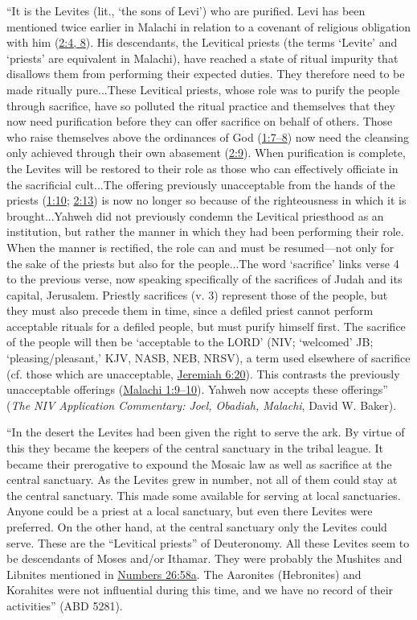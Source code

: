 		``It is the Levites (lit., `the sons of Levi') who are purified. Levi has been mentioned twice earlier in Malachi in relation to a covenant of religious obligation with him (\hyperref[MALACHI-2-4]{2:4, 8}). His descendants, the Levitical priests (the terms `Levite' and `priests' are equivalent in Malachi), have reached a state of ritual impurity that disallows them from performing their expected duties. They therefore need to be made ritually pure...These Levitical priests, whose role was to purify the people through sacrifice, have so polluted the ritual practice and themselves that they now need purification before they can offer sacrifice on behalf of others. Those who raise themselves above the ordinances of God (\hyperref[MALACHI-1-7]{1:7--8}) now need the cleansing only achieved through their own abasement (\hyperref[MALACHI-2-9]{2:9}). When purification is complete, the Levites will be restored to their role as those who can effectively officiate in the sacrificial cult...The offering previously unacceptable from the hands of the priests (\hyperref[MALACHI-1-10]{1:10}; \hyperref[MALACHI-2-13]{2:13}) is now no longer so because of the righteousness in which it is brought...Yahweh did not previously condemn the Levitical priesthood as an institution, but rather the manner in which they had been performing their role. When the manner is rectified, the role can and must be resumed---not only for the sake of the priests but also for the people...The word `sacrifice' links verse 4 to the previous verse, now speaking specifically of the sacrifices of Judah and its capital, Jerusalem. Priestly sacrifices (v. 3) represent those of the people, but they must also precede them in time, since a defiled priest cannot perform acceptable rituals for a defiled people, but must purify himself first. The sacrifice of the people will then be `acceptable to the LORD' (\textsc{NIV}; `welcomed' \textsc{JB}; `pleasing/pleasant,' \textsc{KJV}, \textsc{NASB}, \textsc{NEB}, \textsc{NRSV}), a term used elsewhere of sacrifice (cf. those which are unacceptable, \hyperref[JEREMIAH-6-20]{Jeremiah 6:20}). This contrasts the previously unacceptable offerings (\hyperref[MALACHI-1-9]{Malachi 1:9--10}). Yahweh now accepts these offerings'' (\textit{The NIV Application Commentary: Joel, Obadiah, Malachi}, David W. Baker).
		
		``In the desert the Levites had been given the right to serve the ark. By virtue of this they became the keepers of the central sanctuary in the tribal league. It became their prerogative to expound the Mosaic law as well as sacrifice at the central sanctuary. As the Levites grew in number, not all of them could stay at the central sanctuary. This made some available for serving at local sanctuaries. Anyone could be a priest at a local sanctuary, but even there Levites were preferred. On the other hand, at the central sanctuary only the Levites could serve. These are the ``Levitical priests'' of Deuteronomy. All these Levites seem to be descendants of Moses and/or Ithamar. They were probably the Mushites and Libnites mentioned in \hyperref[NUMBERS-26-58]{Numbers 26:58a}. The Aaronites (Hebronites) and Korahites were not influential during this time, and we have no record of their activities'' (ABD 5281).
	
